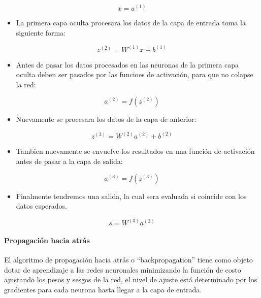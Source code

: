 \documentclass[
  12pt,
]{article}
\providecommand{\tightlist}{%
  \setlength{\itemsep}{0pt}\setlength{\parskip}{0pt}}
\begin{document}
\[ x = a^{(1)}\]

\begin{itemize}
\tightlist
\item
  La primera capa oculta procesara los datos de la capa de entrada toma
  la siguiente forma:
\end{itemize}

\[ z^{(2)} = W^{(1)}x + b^{(1)} \]

\begin{itemize}
\tightlist
\item
  Antes de pasar los datos procesados en las neuronas de la primera capa
  oculta deben ser pasados por las funcioes de activación, para que no
  colapse la red:
\end{itemize}

\[a^{(2)} = f(z^{(2)})\]

\begin{itemize}
\tightlist
\item
  Nuevamente se procesara los datos de la capa de anterior:
\end{itemize}

\[ z^{(3)} = W^{(2)}a^{(2)} + b^{(2)} \]

\begin{itemize}
\tightlist
\item
  Tambien nuevamente se envuelve los resultados en una función de
  activación antes de pasar a la capa de salida:
\end{itemize}

\[a^{(3)} = f(z^{(3)})\]

\begin{itemize}
\tightlist
\item
  Finalmente tendremos una salida, la cual sera evaluada si coincide con
  los datos esperados.
\end{itemize}

\[ s = W^{(3)}a^{(3)} \]

\hypertarget{propagaciuxf3n-hacia-atruxe1s}{%
\paragraph{Propagación hacia
atrás}\label{propagaciuxf3n-hacia-atruxe1s}}

El algoritmo de propagación hacia atrás o ``backpropagation'' tiene como
objeto dotar de aprendizaje a las redes neuronales minimizando la
función de costo ajustando los pesos y sesgos de la red, el nivel de
ajuste está determinado por los gradientes para cada neurona hasta
llegar a la capa de entrada.
\end{document}
